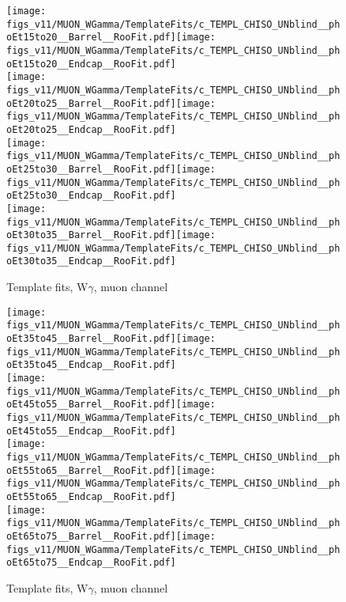 \begin{figure}[htb]
  \begin{center}
   \texttt{[image: figs\_v11/MUON\_WGamma/TemplateFits/c\_TEMPL\_CHISO\_UNblind\_\_phoEt15to20\_\_Barrel\_\_RooFit.pdf]}\texttt{[image: figs\_v11/MUON\_WGamma/TemplateFits/c\_TEMPL\_CHISO\_UNblind\_\_phoEt15to20\_\_Endcap\_\_RooFit.pdf]}\\
   \texttt{[image: figs\_v11/MUON\_WGamma/TemplateFits/c\_TEMPL\_CHISO\_UNblind\_\_phoEt20to25\_\_Barrel\_\_RooFit.pdf]}\texttt{[image: figs\_v11/MUON\_WGamma/TemplateFits/c\_TEMPL\_CHISO\_UNblind\_\_phoEt20to25\_\_Endcap\_\_RooFit.pdf]}\\
   \texttt{[image: figs\_v11/MUON\_WGamma/TemplateFits/c\_TEMPL\_CHISO\_UNblind\_\_phoEt25to30\_\_Barrel\_\_RooFit.pdf]}\texttt{[image: figs\_v11/MUON\_WGamma/TemplateFits/c\_TEMPL\_CHISO\_UNblind\_\_phoEt25to30\_\_Endcap\_\_RooFit.pdf]}\\
   \texttt{[image: figs\_v11/MUON\_WGamma/TemplateFits/c\_TEMPL\_CHISO\_UNblind\_\_phoEt30to35\_\_Barrel\_\_RooFit.pdf]}\texttt{[image: figs\_v11/MUON\_WGamma/TemplateFits/c\_TEMPL\_CHISO\_UNblind\_\_phoEt30to35\_\_Endcap\_\_RooFit.pdf]}\\
  \label{fig:templateFits_CHISO_MUON_1}
  \caption{Template fits, W$\gamma$, muon channel}
  \end{center}
\end{figure}

\begin{figure}[htb]
  \begin{center}
   \texttt{[image: figs\_v11/MUON\_WGamma/TemplateFits/c\_TEMPL\_CHISO\_UNblind\_\_phoEt35to45\_\_Barrel\_\_RooFit.pdf]}\texttt{[image: figs\_v11/MUON\_WGamma/TemplateFits/c\_TEMPL\_CHISO\_UNblind\_\_phoEt35to45\_\_Endcap\_\_RooFit.pdf]}\\
   \texttt{[image: figs\_v11/MUON\_WGamma/TemplateFits/c\_TEMPL\_CHISO\_UNblind\_\_phoEt45to55\_\_Barrel\_\_RooFit.pdf]}\texttt{[image: figs\_v11/MUON\_WGamma/TemplateFits/c\_TEMPL\_CHISO\_UNblind\_\_phoEt45to55\_\_Endcap\_\_RooFit.pdf]}\\
   \texttt{[image: figs\_v11/MUON\_WGamma/TemplateFits/c\_TEMPL\_CHISO\_UNblind\_\_phoEt55to65\_\_Barrel\_\_RooFit.pdf]}\texttt{[image: figs\_v11/MUON\_WGamma/TemplateFits/c\_TEMPL\_CHISO\_UNblind\_\_phoEt55to65\_\_Endcap\_\_RooFit.pdf]}\\
   \texttt{[image: figs\_v11/MUON\_WGamma/TemplateFits/c\_TEMPL\_CHISO\_UNblind\_\_phoEt65to75\_\_Barrel\_\_RooFit.pdf]}\texttt{[image: figs\_v11/MUON\_WGamma/TemplateFits/c\_TEMPL\_CHISO\_UNblind\_\_phoEt65to75\_\_Endcap\_\_RooFit.pdf]}\\
  \label{fig:templateFits_CHISO_MUON_2}
  \caption{Template fits, W$\gamma$, muon channel}
  \end{center}
\end{figure}

